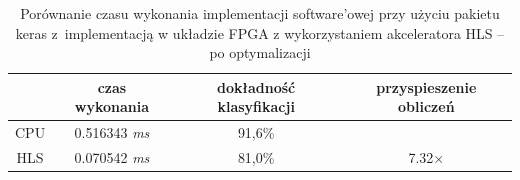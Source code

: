 \begin{table}[h] \centering
  \caption{Porównanie czasu wykonania implementacji software'owej przy użyciu pakietu keras z~implementacją w układzie FPGA z wykorzystaniem akceleratora HLS -- po optymalizacji} 
  \centering
  \begin{tabular} {c|c|c|c} \hline \label{tab:czas-wykonania2}
      
      & czas wykonania & dokładność klasyfikacji & przyspieszenie obliczeń\\ \hline
     CPU & 0.516343 \emph{ms} & 91,6\%  & \\
     HLS & 0.070542 \emph{ms} & 81,0\% & 7.32$\times$ \\
    \end{tabular}
  \end{table}

